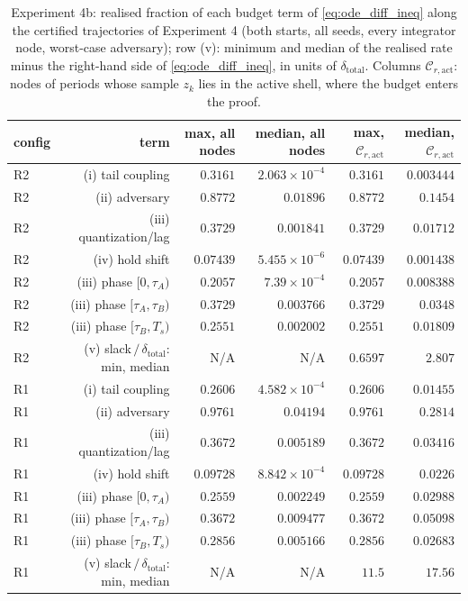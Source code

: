 \begin{table}[t]
\centering
\caption{Experiment 4b: realised fraction of each budget term of \eqref{eq:ode_diff_ineq} along the certified trajectories of Experiment 4 (both starts, all seeds, every integrator node, worst-case adversary); row (v): minimum and median of the realised rate minus the right-hand side of \eqref{eq:ode_diff_ineq}, in units of $\delta_{\mathrm{total}}$. Columns $\mathcal{C}_{r,\mathrm{act}}$: nodes of periods whose sample $z_k$ lies in the active shell, where the budget enters the proof.}
\label{tab:exp4b_budget}
\footnotesize
\setlength{\tabcolsep}{4pt}
\begin{tabular}{lrrrrr}
\toprule
config & term & max, all nodes & median, all nodes & max, $\mathcal{C}_{r,\mathrm{act}}$ & median, $\mathcal{C}_{r,\mathrm{act}}$ \\
\midrule
R2 & (i) tail coupling & $0.3161$ & $2.063\times10^{-4}$ & $0.3161$ & $0.003444$ \\
R2 & (ii) adversary & $0.8772$ & $0.01896$ & $0.8772$ & $0.1454$ \\
R2 & (iii) quantization/lag & $0.3729$ & $0.001841$ & $0.3729$ & $0.01712$ \\
R2 & (iv) hold shift & $0.07439$ & $5.455\times10^{-6}$ & $0.07439$ & $0.001438$ \\
R2 & (iii) phase $[0,\tau_A)$ & $0.2057$ & $7.39\times10^{-4}$ & $0.2057$ & $0.008388$ \\
R2 & (iii) phase $[\tau_A,\tau_B)$ & $0.3729$ & $0.003766$ & $0.3729$ & $0.0348$ \\
R2 & (iii) phase $[\tau_B,T_s)$ & $0.2551$ & $0.002002$ & $0.2551$ & $0.01809$ \\
R2 & (v) slack$\,/\,\delta_{\mathrm{total}}$: min, median & N/A & N/A & $0.6597$ & $2.807$ \\
R1 & (i) tail coupling & $0.2606$ & $4.582\times10^{-4}$ & $0.2606$ & $0.01455$ \\
R1 & (ii) adversary & $0.9761$ & $0.04194$ & $0.9761$ & $0.2814$ \\
R1 & (iii) quantization/lag & $0.3672$ & $0.005189$ & $0.3672$ & $0.03416$ \\
R1 & (iv) hold shift & $0.09728$ & $8.842\times10^{-4}$ & $0.09728$ & $0.0226$ \\
R1 & (iii) phase $[0,\tau_A)$ & $0.2559$ & $0.002249$ & $0.2559$ & $0.02988$ \\
R1 & (iii) phase $[\tau_A,\tau_B)$ & $0.3672$ & $0.009477$ & $0.3672$ & $0.05098$ \\
R1 & (iii) phase $[\tau_B,T_s)$ & $0.2856$ & $0.005166$ & $0.2856$ & $0.02683$ \\
R1 & (v) slack$\,/\,\delta_{\mathrm{total}}$: min, median & N/A & N/A & $11.5$ & $17.56$ \\
\bottomrule
\end{tabular}
\end{table}
